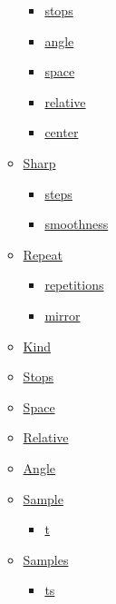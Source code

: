 \begin{itemize}
\begin{itemize}
    \begin{itemize}
    \tightlist
    \item
      \hyperref[definitions-conic-stops]{stops}
    \item
      \hyperref[definitions-conic-angle]{angle}
    \item
      \hyperref[definitions-conic-space]{space}
    \item
      \hyperref[definitions-conic-relative]{relative}
    \item
      \hyperref[definitions-conic-center]{center}
    \end{itemize}
  \item
    \hyperref[definitions-sharp]{Sharp}

    \begin{itemize}
    \tightlist
    \item
      \hyperref[definitions-sharp-steps]{steps}
    \item
      \hyperref[definitions-sharp-smoothness]{smoothness}
    \end{itemize}
  \item
    \hyperref[definitions-repeat]{Repeat}

    \begin{itemize}
    \tightlist
    \item
      \hyperref[definitions-repeat-repetitions]{repetitions}
    \item
      \hyperref[definitions-repeat-mirror]{mirror}
    \end{itemize}
  \item
    \hyperref[definitions-kind]{Kind}
  \item
    \hyperref[definitions-stops]{Stops}
  \item
    \hyperref[definitions-space]{Space}
  \item
    \hyperref[definitions-relative]{Relative}
  \item
    \hyperref[definitions-angle]{Angle}
  \item
    \hyperref[definitions-sample]{Sample}

    \begin{itemize}
    \tightlist
    \item
      \hyperref[definitions-sample-t]{t}
    \end{itemize}
  \item
    \hyperref[definitions-samples]{Samples}

    \begin{itemize}
    \tightlist
    \item
      \hyperref[definitions-samples-ts]{ts}
    \end{itemize}
  \end{itemize}
\end{itemize}

